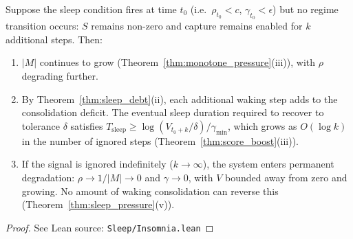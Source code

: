 \begin{corollary}
\label{cor:insomnia}
\leanok
Suppose the sleep condition fires at time $t_0$ (i.e.\ $\rho_{t_0} < c$, $\gamma_{t_0} < \epsilon$) but no regime transition occurs: $S$ remains non-zero and capture remains enabled for $k$ additional steps.  Then:
\begin{enumerate}
\item $|M|$ continues to grow (Theorem~\ref{thm:monotone_pressure}(iii)), with $\rho$ degrading further.
\item By Theorem~\ref{thm:sleep_debt}(ii), each additional waking step adds to the consolidation deficit.  The eventual sleep duration required to recover to tolerance $\delta$ satisfies $T_{\mathrm{sleep}} \geq \log(V_{t_0+k}/\delta)/\gamma_{\min}$, which grows as $O(\log k)$ in the number of ignored steps (Theorem~\ref{thm:score_boost}(iii)).
\item If the signal is ignored indefinitely ($k \to \infty$), the system enters permanent degradation: $\rho \to 1/|M| \to 0$ and $\gamma \to 0$, with $V$ bounded away from zero and growing.  No amount of waking consolidation can reverse this (Theorem~\ref{thm:sleep_pressure}(v)).
\end{enumerate}
\end{corollary}

\begin{proof}
\leanok
See Lean source: \texttt{Sleep/Insomnia.lean}
\end{proof}

